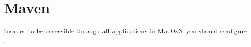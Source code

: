 \section{Maven}
Inorder to  be accessible through all applications in MacOsX you should configure .
